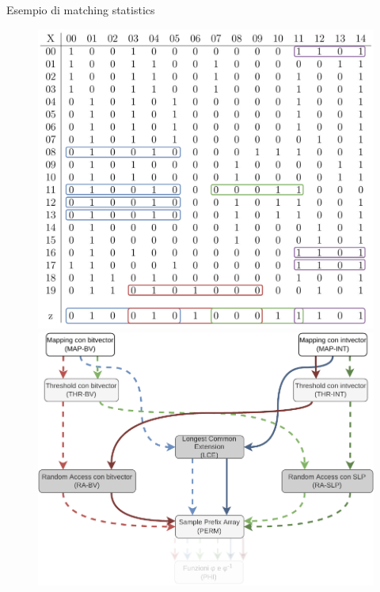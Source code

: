 \documentclass[]{beamer}
\begin{document}
\begin{frame}{Esempio di matching statistics}
  \vspace{-0.3cm}
 \begin{figure}[H]
    \centering
    \includegraphics[scale = 0.21, valign=t]{img/pbwtmatch.pdf}
    \includegraphics[scale = 0.3, valign=t]{img/mini_ms3.pdf}
  \end{figure}
  \vspace{-0.5cm}
  \begin{table}[H]
    \scriptsize
    \centering
    \begin{tabular}{c|ccccccccccccccc}

\end{tabular}
\end{table}
\end{frame}
\end{document}

